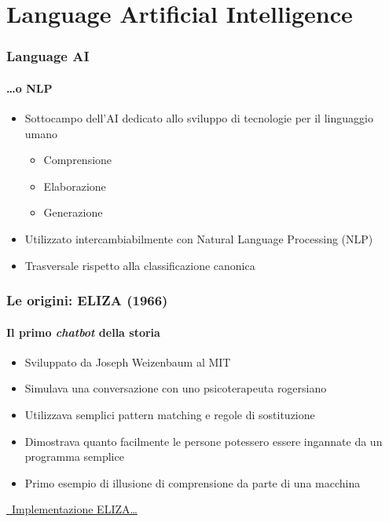 \section{Language Artificial Intelligence} %
\label{sec:language_ai}
%
\begin{frame}[t,fragile] \frametitle{Language AI}
    \framesubtitle{\ldots o NLP}
	{\small
	    \begin{minipage}[t]{\textwidth}
	    	\begin{itemize}[leftmargin=10pt,align=right]
				\onslide<1->\item[\alert{\faHandORight}] Sottocampo dell'AI dedicato allo sviluppo di tecnologie per il linguaggio umano
				\begin{itemize}[leftmargin=10pt,align=right]
					\item[\alert{\faHandORight}] Comprensione
					\item[\alert{\faHandORight}] Elaborazione
					\item[\alert{\faHandORight}] Generazione
				\end{itemize}
				\item[\alert{\faHandORight}] Utilizzato intercambiabilmente con \alert{Natural Language Processing} (NLP)
				\onslide<3->\item[\alert{\faExclamationTriangle}] \alert{Trasversale} rispetto alla classificazione canonica
			\end{itemize}
	    \end{minipage}
	}
\end{frame}
%
\begin{frame}[t,fragile] \frametitle{Le origini: ELIZA (1966)}
    \framesubtitle{Il primo \textit{chatbot} della storia}
	{\small
	    \begin{minipage}[t]{\textwidth}
	    	\begin{itemize}[leftmargin=10pt,align=right]
				\onslide<1->\item[\alert{\faHandORight}] Sviluppato da \alert{Joseph Weizenbaum} al MIT
				\onslide<2->\item[\alert{\faHandORight}] Simulava una conversazione con uno \alert{psicoterapeuta} rogersiano
				\onslide<3->\item[\alert{\faHandORight}] Utilizzava semplici \alert{pattern matching} e regole di sostituzione
				\onslide<4->\item[\alert{\faHandORight}] Dimostrava quanto facilmente le persone potessero essere \alert{ingannate} da un programma semplice
				\onslide<5->\item[\alert{\faHandORight}] Primo esempio di \alert{illusione di comprensione} da parte di una macchina
			\end{itemize}
        \end{minipage}
		\vfill
		\begin{center}
			\href{https://www.masswerk.at/elizabot/eliza.html}{\faLink\ Implementazione ELIZA\ldots}
		\end{center}
	}
\end{frame}
